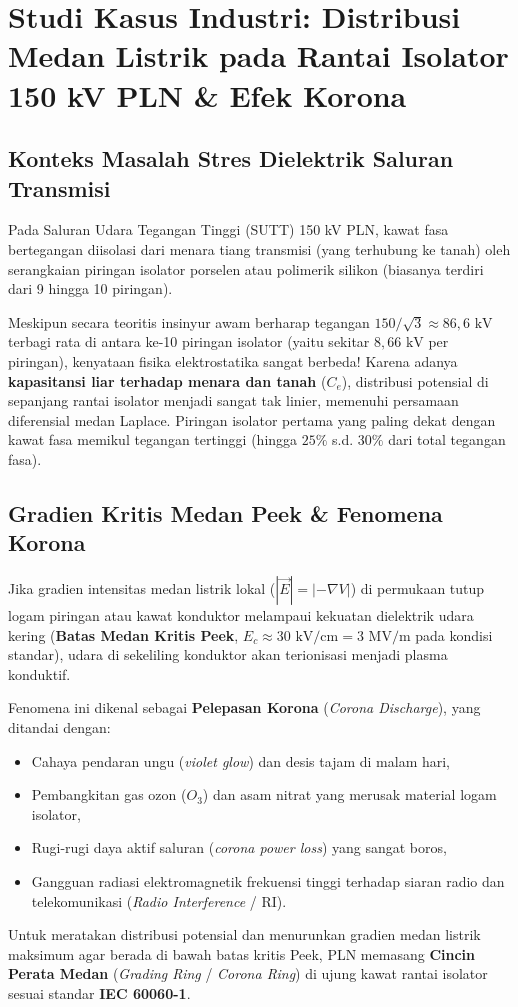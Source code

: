 \documentclass[11pt,a4paper]{article}
\theoremstyle{definition}
\begin{document}
\section{Studi Kasus Industri: Distribusi Medan Listrik pada Rantai Isolator 150 kV PLN \& Efek Korona}

\subsection{Konteks Masalah Stres Dielektrik Saluran Transmisi}
Pada Saluran Udara Tegangan Tinggi (SUTT) 150 kV PLN, kawat fasa bertegangan diisolasi dari menara tiang transmisi (yang terhubung ke tanah) oleh serangkaian piringan isolator porselen atau polimerik silikon (biasanya terdiri dari 9 hingga 10 piringan).

Meskipun secara teoritis insinyur awam berharap tegangan $150/\sqrt{3} \approx 86{,}6\text{ kV}$ terbagi rata di antara ke-10 piringan isolator (yaitu sekitar $8{,}66\text{ kV}$ per piringan), kenyataan fisika elektrostatika sangat berbeda! Karena adanya \textbf{kapasitansi liar terhadap menara dan tanah} ($C_e$), distribusi potensial di sepanjang rantai isolator menjadi sangat tak linier, memenuhi persamaan diferensial medan Laplace. Piringan isolator pertama yang paling dekat dengan kawat fasa memikul tegangan tertinggi (hingga $25\%$ s.d. $30\%$ dari total tegangan fasa).

\subsection{Gradien Kritis Medan Peek \& Fenomena Korona}
Jika gradien intensitas medan listrik lokal ($|\vec{E}| = |-\nabla V|$) di permukaan tutup logam piringan atau kawat konduktor melampaui kekuatan dielektrik udara kering (\textbf{Batas Medan Kritis Peek}, $E_c \approx 30\text{ kV/cm} = 3\text{ MV/m}$ pada kondisi standar), udara di sekeliling konduktor akan terionisasi menjadi plasma konduktif. 

Fenomena ini dikenal sebagai \textbf{Pelepasan Korona} (\textit{Corona Discharge}), yang ditandai dengan:
\begin{itemize}[leftmargin=*]
    \item Cahaya pendaran ungu (\textit{violet glow}) dan desis tajam di malam hari,
    \item Pembangkitan gas ozon ($O_3$) dan asam nitrat yang merusak material logam isolator,
    \item Rugi-rugi daya aktif saluran (\textit{corona power loss}) yang sangat boros,
    \item Gangguan radiasi elektromagnetik frekuensi tinggi terhadap siaran radio dan telekomunikasi (\textit{Radio Interference} / RI).
\end{itemize}
Untuk meratakan distribusi potensial dan menurunkan gradien medan listrik maksimum agar berada di bawah batas kritis Peek, PLN memasang \textbf{Cincin Perata Medan} (\textit{Grading Ring} / \textit{Corona Ring}) di ujung kawat rantai isolator sesuai standar \textbf{IEC 60060-1}.
\end{document}

